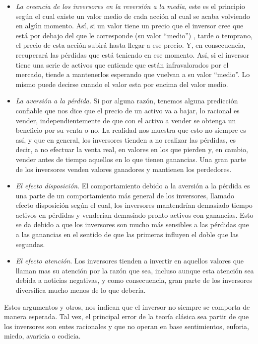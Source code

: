 \begin{itemize}
	\item \emph{La creencia de los inversores en la reversión a la media}, este es el principio según el cual existe un valor medio de cada acción al cual se acaba volviendo en algún momento. Así, si un valor tiene un precio que el inversor cree que está por debajo del que le corresponde (su valor “medio”) , tarde o temprano, el precio de esta acción subirá hasta llegar a ese precio. Y, en consecuencia, recuperará las pérdidas que está teniendo en ese momento. Así, si el inversor tiene una serie de activos que entiende que están infravalorados por el mercado, tiende a mantenerlos esperando que vuelvan a su valor “medio”. Lo mismo puede decirse cuando el valor esta por encima del valor medio.  	

	\item \emph{La aversión a la pérdida. } Si por alguna razón, tenemos alguna predicción confiable que nos dice que el precio de un activo va a bajar, lo racional es vender, independientemente de que con el activo a vender se obtenga un beneficio por su venta o no.
	La realidad nos muestra que esto no siempre es así, y que en general, los inversores tienden a no realizar las pérdidas, es decir, a no efectuar la venta real, en valores en los que pierden y, en cambio, vender antes de tiempo aquellos en lo que tienen ganancias. Una gran parte de los inversores venden valores ganadores y mantienen los perdedores.
	
	\item \emph{El efecto disposición}. El comportamiento debido a la aversión a la pérdida es una parte de un comportamiento más general de los inversores, llamado efecto disposición según el cual, los inversores mantendrían demasiado tiempo activos en pérdidas y venderían demasiado pronto activos con ganancias. Esto se da debido a que los inversores son mucho más sensibles a las pérdidas que a las ganancias en el sentido de que las primeras influyen el doble que las segundas.
	
	\item \emph{El efecto atención}. Los inversores tienden a invertir en aquellos valores que llaman mas su atención por la razón que sea, incluso aunque esta atención sea debida a noticias negativas, y como consecuencia, gran parte de los inversores diversifica mucho menos de lo que debería.
\end{itemize}

Estos argumentos y otros, nos indican que el inversor no siempre se comporta de manera esperada. Tal vez, el principal error de la teoría clásica sea partir de que los inversores son entes racionales y que no operan en base sentimientos, euforia, miedo, avaricia o codicia.

